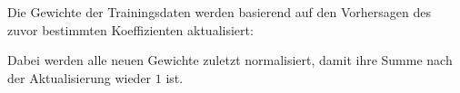 Die Gewichte der Trainingsdaten werden basierend auf
den Vorhersagen des zuvor bestimmten Koeffizienten aktualisiert:

Dabei werden alle neuen Gewichte zuletzt normalisiert,
damit ihre Summe nach der Aktualisierung wieder $1$ ist.
